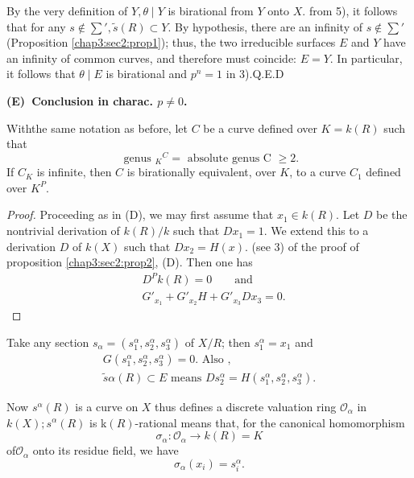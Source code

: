 By the very definition of $Y, \theta \mid Y$ is birational  from $Y$
onto $X$. from 5), it follows that for any  $s  \not\in
\sum',\tilde{s}(R)\subset Y$. By hypothesis, there are an infinity of
$s \not\in\sum'$ (Proposition \ref{chap3:sec2:prop1});  thus, the two irreducible surfaces
$E$ and $Y$ have an infinity  of common curves, and therefore must
coincide: $E=Y$. In particular, it follows that $ \theta \mid E$ is
birational and $p^n = 1$ in 3).\hfill{Q.E.D} 

\medskip
\noindent
\textbf{(E)~Conclusion in charac. $p \neq 0$.} 
 
\begin{proposition}\label{chap3:sec2:prop3}%
  With\pageoriginale the same notation as before, let $C$ be a curve defined over
  $K=k(R)$ such that 
  $$
  \text{ genus } {_K}^{C}=\text{ absolute genus C }\geq 2.
  $$
  If $C_K$ is infinite, then $C$ is birationally equivalent, over $K$,
  to a curve $C_1$ defined over $K^P$.    
\end{proposition}

\begin{proof}%
  Proceeding as in (D), we may first assume that $x_1 \in k(R)$. Let
  $D$ be the nontrivial derivation of  $k(R)/k$ such that $Dx_1=1$. We
  extend this to a derivation $D$ of $k(X)$ such that $
  Dx_2=H(x)$. (see 3) of the proof of proposition
  \ref{chap3:sec2:prop2}, (D). Then one has  
  \begin{align*}
    &D^P k(R)=0 \qquad \text{and}\\
    &G'_{x_1}+G'_{x_2} H +G'_{x_3} Dx_3 =0.
  \end{align*}
\end{proof}

Take any section $s_\alpha =(s^\alpha _{1},s^\alpha_{2},s^\alpha_{3})$
of $X/R$; then $s^\alpha_{1}=x_1$ and  
\begin{gather*}
  G(s^\alpha_{1},s^\alpha_{2},s^\alpha_{3})=0. \text{ Also },\\
  {\tilde{s} \alpha }(R)\subset  E \text{ means } Ds_{2}^{\alpha }=H
  (s^\alpha_{1},s^\alpha_{2},s^\alpha_{3}).  
\end{gather*}
 
Now $s^{\alpha }(R)$ is a curve on $X$ thus defines a discrete
valuation ring $\mathscr{O}_\alpha $ in $k(X);s^{\alpha }(R)$ is
k$(R)$-rational means that, for the canonical homomorphism  
$$
\sigma_{\alpha }:\mathscr{O}_{\alpha }\rightarrow k(R)=K
$$
of\pageoriginale $\mathscr{O}_\alpha $ onto its residue field, we have 
$$
\sigma_\alpha  (x_i)=s_{i}^{\alpha }. 
$$


